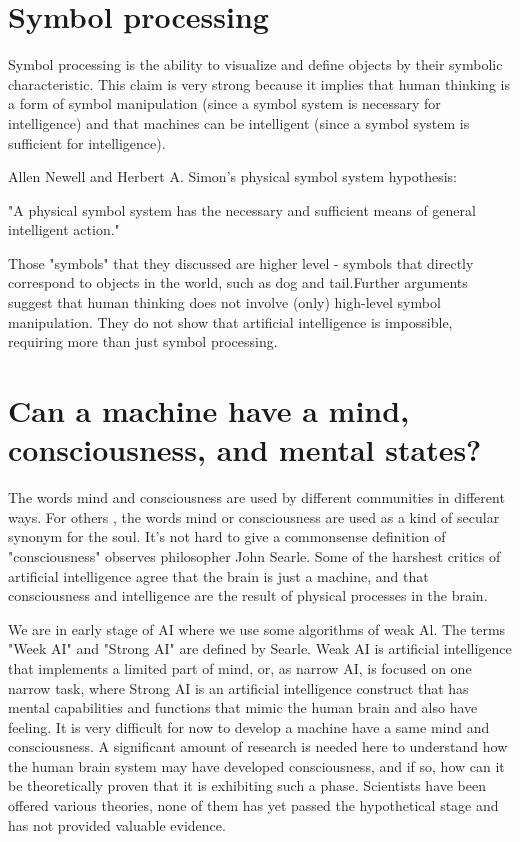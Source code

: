 \documentclass{article}
\begin{document}
\section{Symbol processing}
Symbol processing is the ability to visualize and define objects by their symbolic characteristic. This claim is very strong because it implies that human thinking is a form of symbol manipulation (since a symbol system is necessary for intelligence) and that machines can be intelligent (since a symbol system is sufficient for intelligence).


Allen Newell and Herbert A. Simon's physical symbol system hypothesis: 

"A physical symbol system has the necessary and sufficient means of general intelligent action."


Those "symbols" that they discussed are higher level - symbols that directly correspond to objects in the world, such as dog and tail.Further arguments suggest that human thinking does not involve (only) high-level symbol manipulation. They do not show that artificial intelligence is impossible, requiring more than just symbol processing. 

\section{Can a machine have a mind, consciousness, and mental states?}

The words mind and consciousness are used by different communities in different ways. For others , the words mind or consciousness are used as a kind of secular synonym for the soul. It's not hard to give a commonsense definition of "consciousness" observes philosopher John Searle. Some of the harshest critics of artificial intelligence agree that the brain is just a machine, and that consciousness and intelligence are the result of physical processes in the brain.

We are in early stage of AI where we use some algorithms of weak Al. The terms "Week AI" and "Strong AI" are defined by Searle. Weak AI is artificial intelligence that implements a limited part of mind, or, as narrow AI, is focused on one narrow task, where Strong AI is an artificial intelligence construct that has mental capabilities and functions that mimic the human brain and also have feeling. It is very difficult for now to develop a machine have a same  mind and consciousness.  A significant amount of research is needed here to understand how the human brain system may have developed consciousness, and if so, how can it be theoretically proven that it is exhibiting such a phase. Scientists have been offered various theories, none of them has yet passed the hypothetical stage and has not provided valuable evidence.
\end{document}
